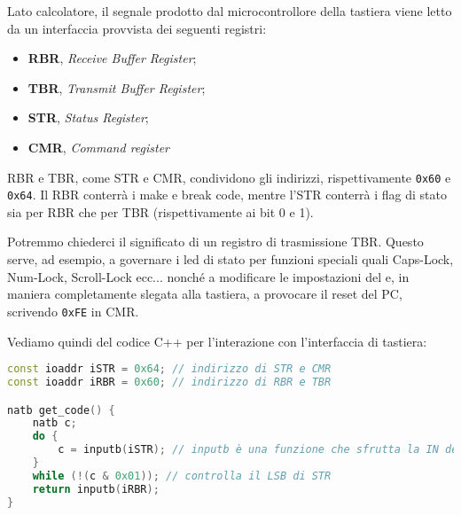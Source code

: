 \documentclass[a4paper,11pt]{article}
\begin{document}
Lato calcolatore, il segnale prodotto dal microcontrollore della tastiera viene letto da un interfaccia provvista dei seguenti registri:
\begin{itemize}
	\item \textbf{RBR}, \textit{Receive Buffer Register};
	\item \textbf{TBR}, \textit{Transmit Buffer Register};
	\item \textbf{STR}, \textit{Status Register};
	\item \textbf{CMR}, \textit{Command register}
\end{itemize}

RBR e TBR, come STR e CMR, condividono gli indirizzi, rispettivamente \lstinline|0x60| e \lstinline|0x64|.
Il RBR conterrà i make e break code, mentre l'STR conterrà i flag di stato sia per RBR che per TBR (rispettivamente ai bit 0 e 1).

Potremmo chiederci il significato di un registro di trasmissione TBR.
Questo serve, ad esempio, a governare i led di stato per funzioni speciali quali Caps-Lock, Num-Lock, Scroll-Lock ecc... nonché a modificare le impostazioni del  e, in maniera completamente slegata alla tastiera, a provocare il reset del PC, scrivendo \lstinline|0xFE| in CMR.

Vediamo quindi del codice C++ per l'interazione con l'interfaccia di tastiera:
\begin{lstlisting}[language=C++, style=codestyle]	
const ioaddr iSTR = 0x64; // indirizzo di STR e CMR
const ioaddr iRBR = 0x60; // indirizzo di RBR e TBR

natb get_code() {
	natb c;
	do {
		c = inputb(iSTR); // inputb è una funzione che sfrutta la IN dell'asm
	}
	while (!(c & 0x01)); // controlla il LSB di STR
	return inputb(iRBR);
}
\end{lstlisting}
\end{document}
